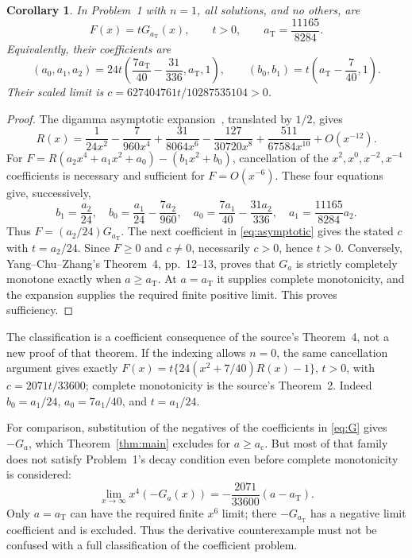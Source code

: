 \documentclass[11pt]{article}
\newtheorem{corollary}[theorem]{Corollary}
\newcommand{\ac}{a_{\mathrm c}}
\newcommand{\at}{a_{\mathrm T}}
\begin{document}
\begin{corollary}\label{cor:quartic}
In Problem~1 with $n=1$, all solutions, and no others, are
\begin{equation}
F(x)=tG_{\at}(x),\qquad t>0,\qquad
\at=\frac{11165}{8284}.
\label{eq:quartic}
\end{equation}
Equivalently, their coefficients are
\[
(a_0,a_1,a_2)=24t\left(\frac{7\at}{40}-\frac{31}{336},\at,1\right),
\qquad (b_0,b_1)=t\left(\at-\frac7{40},1\right).
\]
Their scaled limit is
$c=627404761t/10287535104>0$.
\end{corollary}
\begin{proof}
The digamma asymptotic expansion~\cite[5.11.2]{dlmf}, translated by
$1/2$, gives
\begin{equation}
R(x)=\frac1{24x^2}-\frac7{960x^4}+\frac{31}{8064x^6}
-\frac{127}{30720x^8}+\frac{511}{67584x^{10}}+O(x^{-12}).
\label{eq:asymptotic}
\end{equation}
For $F=R(a_2x^4+a_1x^2+a_0)-(b_1x^2+b_0)$,
cancellation of the $x^2,x^0,x^{-2},x^{-4}$ coefficients is necessary
and sufficient for $F=O(x^{-6})$. These four equations give, successively,
\[
b_1=\frac{a_2}{24},\quad b_0=\frac{a_1}{24}-\frac{7a_2}{960},\quad
a_0=\frac{7a_1}{40}-\frac{31a_2}{336},\quad
a_1=\frac{11165}{8284}a_2.
\]
Thus $F=(a_2/24)G_{\at}$. The next coefficient in
\eqref{eq:asymptotic} gives the stated $c$ with $t=a_2/24$.
Since $F\geq0$ and $c\ne0$, necessarily $c>0$, hence $t>0$.
Conversely, Yang--Chu--Zhang's Theorem~4, pp.~12--13, proves that
$G_a$ is strictly completely monotone exactly when $a\geq\at$.
At $a=\at$ it supplies complete monotonicity, and the expansion supplies
the required finite positive limit. This proves sufficiency.
\end{proof}

The classification is a coefficient consequence of the source's
Theorem~4, not a new proof of that theorem. If the indexing allows $n=0$,
the same cancellation argument gives exactly
$F(x)=t\{24(x^2+7/40)R(x)-1\}$, $t>0$, with
$c=2071t/33600$; complete monotonicity is the source's Theorem~2.
Indeed $b_0=a_1/24$, $a_0=7a_1/40$, and $t=a_1/24$.

For comparison, substitution of the negatives of the coefficients in
\eqref{eq:G} gives $-G_a$, which Theorem~\ref{thm:main} excludes for
$a\geq\ac$. But most of that family does not satisfy Problem~1's
decay condition even before complete monotonicity is considered:
\begin{equation}
\lim_{x\to\infty}x^4(-G_a(x))
=-\frac{2071}{33600}(a-\at).
\label{eq:decay}
\end{equation}
Only $a=\at$ can have the required finite $x^6$ limit; there
$-G_{\at}$ has a negative limit coefficient and is excluded.
Thus the derivative counterexample must not be confused with a full
classification of the coefficient problem.
\end{document}
